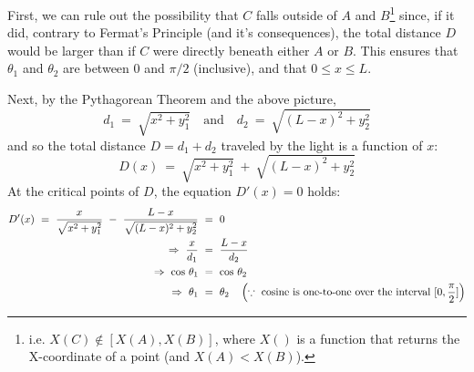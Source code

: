 \begin{exmp}
First, we can rule out the possibility that $C$ falls outside of $A$
and $B$\footnote{i.e. $X(C) \notin [X(A),X(B)]$, where $X()$ is a
function that returns the X-coordinate of a point (and $X(A)<X(B)$).}
since, if it did, contrary to Fermat's Principle (and it's
consequences), the total distance $D$ would be larger than if $C$ were
directly beneath either $A$ or $B$. This ensures that $\theta_1$ and
$\theta_2$ are between $0$ and $\pi/2$ (inclusive), and that $0 \le x
\le L$.

Next, by the Pythagorean Theorem and the above picture,
\[
d_1 ~=~ \sqrt{x^2 + y_1^2} \quad\text{and}\quad
d_2 ~=~ \sqrt{(L-x)^2 + y_2^2}
\]
and so the total distance $D = d_1 + d_2$ traveled by the light is a function
of $x$:
\[
D(x) ~=~ \sqrt{x^2 + y_1^2} ~+~ \sqrt{(L-x)^2 + y_2^2}
\]
At the critical points of $D$, the equation $D'(x)=0$ holds:
\begin{align*}
D'(x) ~=~ \frac{x}{\sqrt{x^2 + y_1^2}} ~-~ \frac{L-x}{\sqrt{(L-x)^2 + y_2^2}} ~&=~ 0\\
\Rightarrow~\frac{x}{d_1} ~&=~ \frac{L-x}{d_2}\\
\Rightarrow~\cos\,\theta_1 ~&=~ \cos\,\theta_2\\
\Rightarrow~\theta_1 ~&=~ \theta_2 \quad\left(\because~\text{cosine is one-to-one over the interval $\lbrack 0,\frac{\pi}{2} \rbrack$}\right)
\end{align*}


\end{exmp}

